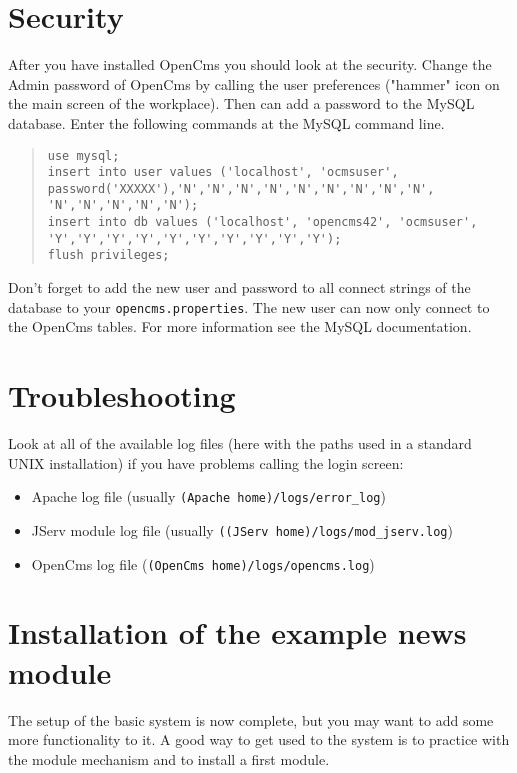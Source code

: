 \section{Security}

After you have installed OpenCms you should look at the security.
Change the Admin password of OpenCms by calling the user preferences 
("hammer" icon on the main screen of the workplace). 
Then can add a password to the MySQL database. Enter the following commands 
at the MySQL command line.\\ 

\begin{quote}
\begin{verbatim}
use mysql;
insert into user values ('localhost', 'ocmsuser',
password('XXXXX'),'N','N','N','N','N','N','N','N','N',
'N','N','N','N','N'); 
insert into db values ('localhost', 'opencms42', 'ocmsuser',
'Y','Y','Y','Y','Y','Y','Y','Y','Y','Y'); 
flush privileges; 
\end{verbatim}
\end{quote}

Don't forget to add the new user and password to all connect strings 
of the database to your \texttt{opencms.properties}. 
The new user can now only connect to the OpenCms tables. 
For more information see the MySQL documentation. 

\section{Troubleshooting}

Look at all of the available log files 
(here with the paths used in a standard UNIX installation) 
if you have problems calling the login screen: 

\begin{itemize}
\item Apache log file (usually \texttt{(Apache home)/logs/error\_log})
\item JServ module log file (usually \texttt{((JServ home)/logs/mod\_jserv.log})
\item OpenCms log file (\texttt{(OpenCms home)/logs/opencms.log})
\end{itemize}

\section{Installation of the example news module}

The setup of the basic system is now complete, but you may want
to add some more functionality to it.
A good way to get used to the system is to practice with the 
module mechanism and to install a first module. 

